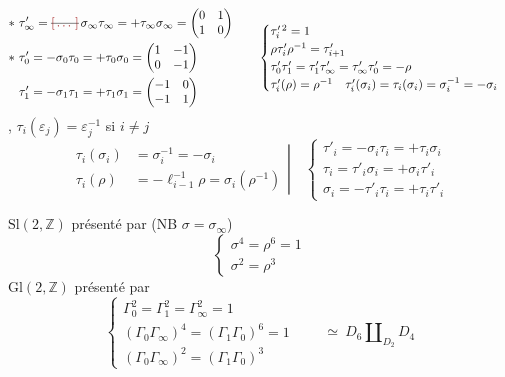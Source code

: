 \documentclass[11pt,a4paper]{article}
\begin{document}
\[
\begin{aligned}
&{*}\ \tau'_\infty = \text{\struck{\ill{}}}\,\sigma_\infty\tau_\infty = +\tau_\infty\sigma_\infty = \begin{pmatrix} 0 & 1 \\ 1 & 0 \end{pmatrix} \\
&{*}\ \tau'_0 = -\sigma_0\tau_0 = +\tau_0\sigma_0 = \begin{pmatrix} 1 & -1 \\ 0 & -1 \end{pmatrix} \\
&\phantom{*}\ \tau'_1 = -\sigma_1\tau_1 = +\tau_1\sigma_1 = \begin{pmatrix} -1 & 0 \\ -1 & 1 \end{pmatrix}
\end{aligned}
\qquad
\begin{cases}
\tau_i'^{\,2} = 1 \\
\rho\tau'_i\rho^{-1} = \tau'_{i+1} \\
\tau'_0\tau'_1 = \tau'_1\tau'_\infty = \tau'_\infty\tau'_0 = -\rho \\
\tau'_i(\rho) = \rho^{-1} \quad \tau'_i(\sigma_i) = \tau_i(\sigma_i) = \sigma_i^{-1} = -\sigma_i
\end{cases}
\]
\struck{\ill{}}, $\tau_i(\varepsilon_j) = \varepsilon_j^{-1}$ si $i \neq j$
\[
\left.
\begin{aligned}
\tau_i(\sigma_i) &= \sigma_i^{-1} = -\sigma_i \\
\tau_i(\rho) &= -\ell_{i-1}^{-1}\rho = \sigma_i(\rho^{-1})
\end{aligned}
\right|
\quad
\begin{cases}
\tau'_i = -\sigma_i\tau_i = +\tau_i\sigma_i \\
\tau_i = \tau'_i\sigma_i = +\sigma_i\tau'_i \\
\sigma_i = -\tau'_i\tau_i = +\tau_i\tau'_i
\end{cases}
\]

$\mathrm{Sl}(2,\mathbb{Z})$ présenté par (NB $\sigma = \sigma_\infty$)
\[
\boxed{\begin{cases} \sigma^4 = \rho^6 = 1 \\ \sigma^2 = \rho^3 \end{cases}}
\]
$\mathrm{Gl}(2,\mathbb{Z})$ présenté par
\[
\boxed{\begin{cases} \Gamma_0^2 = \Gamma_1^2 = \Gamma_\infty^2 = 1 \\ (\Gamma_0\Gamma_\infty)^4 = (\Gamma_1\Gamma_0)^6 = 1 \\ (\Gamma_0\Gamma_\infty)^2 = (\Gamma_1\Gamma_0)^3 \end{cases}}
\qquad \simeq \ D_6 \amalg_{D_2} D_4
\]
\end{document}
